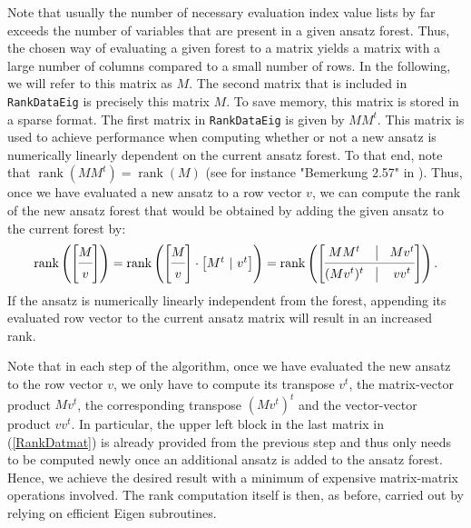 Note that usually the number of necessary evaluation index value lists by far exceeds the number of variables that are present in a given ansatz forest. Thus, the chosen way of evaluating a given forest to a matrix yields a matrix with a large number of columns compared to a small number of rows. In the following, we will refer to this matrix as $M$. The second matrix that is included in \texttt{RankDataEig} is precisely this matrix $M$. To save memory, this matrix is stored in a sparse format. The first matrix in \texttt{RankDataEig} is given by $M M^t$. This matrix is used to achieve performance when computing whether or not a new ansatz is numerically linearly dependent on the current ansatz forest. To that end, note that $\operatorname{rank}(MM^t) = \operatorname{rank}(M)$ (see for instance "Bemerkung 2.57" in \cite{LAKnab}). Thus, once we have evaluated a new ansatz to a row vector $v$, we can compute the rank of the new ansatz forest that would be obtained by adding the given ansatz to the current forest by:
\begin{align}\label{RankDatmat}
    \operatorname{rank}\left (\begin{bmatrix}
        M \\
        \cmidrule(lr){1-1} 
        v
    \end{bmatrix} \right )
    = \operatorname{rank} \left ( \begin{bmatrix}
        M \\
        \cmidrule(lr){1-1}
        v
    \end{bmatrix} \cdot \begin{bmatrix}
        M^t \ \vert \  v^t 
    \end{bmatrix} \right ) = \operatorname{rank} \left (\begin{bmatrix}
        MM^t & \vline & M v^t \\
        \cmidrule(lr){1-3}
        (Mv^t)^t & \vline & vv^t 
    \end{bmatrix}  \right ).
\end{align}
If the ansatz is numerically linearly independent from the forest, appending its evaluated row vector to the current ansatz matrix will result in an increased rank.

Note that in each step of the algorithm, once we have evaluated the new ansatz to the row vector $v$, we only have to compute its transpose $v^t$, the matrix-vector product $Mv^t$, the corresponding transpose $(Mv^t)^t$ and the vector-vector product $v v^t$. In particular, the upper left block in the last matrix in (\ref{RankDatmat}) is already provided from the previous step and thus only needs to be computed newly once an additional ansatz is added to the ansatz forest. Hence, we achieve the desired result with a minimum of expensive matrix-matrix operations involved. The rank computation itself is then, as before, carried out by relying on efficient Eigen subroutines.

